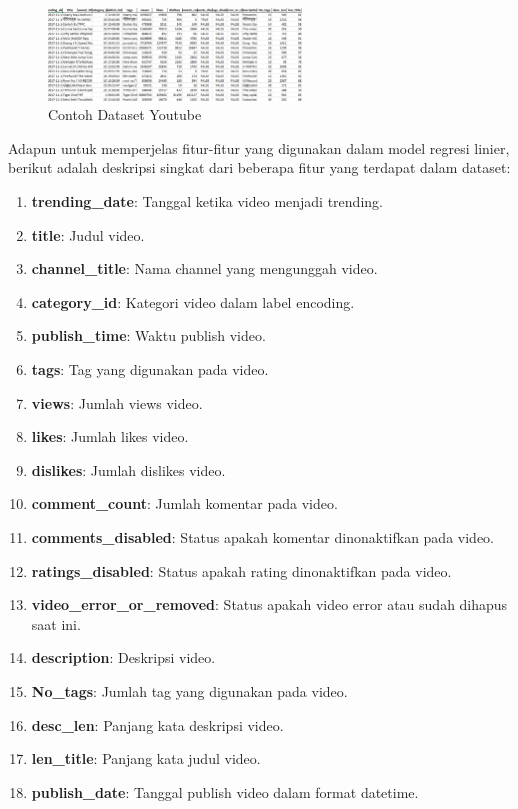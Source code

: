 \begin{figure}[ht]
    \centering
    \includegraphics[width=0.6\textwidth]{gambar/dataset.png}
    \caption{Contoh Dataset Youtube}
    \label{fig:dataset_youtube}
\end{figure}
\newpage
Adapun untuk memperjelas fitur-fitur yang digunakan dalam model regresi linier, berikut adalah deskripsi singkat dari beberapa fitur yang terdapat dalam dataset:

\begin{enumerate}
    \item \textbf{trending\_date}: Tanggal ketika video menjadi trending.
    \item \textbf{title}: Judul video.
    \item \textbf{channel\_title}: Nama channel yang mengunggah video.
    \item \textbf{category\_id}: Kategori video dalam label encoding.
    \item \textbf{publish\_time}: Waktu publish video.
    \item \textbf{tags}: Tag yang digunakan pada video.
    \item \textbf{views}: Jumlah views video.
    \item \textbf{likes}: Jumlah likes video.
    \item \textbf{dislikes}: Jumlah dislikes video.
    \item \textbf{comment\_count}: Jumlah komentar pada video.
    \item \textbf{comments\_disabled}: Status apakah komentar dinonaktifkan pada video.
    \item \textbf{ratings\_disabled}: Status apakah rating dinonaktifkan pada video.
    \item \textbf{video\_error\_or\_removed}: Status apakah video error atau sudah dihapus saat ini.
    \item \textbf{description}: Deskripsi video.
    \item \textbf{No\_tags}: Jumlah tag yang digunakan pada video.
    \item \textbf{desc\_len}: Panjang kata deskripsi video.
    \item \textbf{len\_title}: Panjang kata judul video.
    \item \textbf{publish\_date}: Tanggal publish video dalam format datetime.
\end{enumerate}

